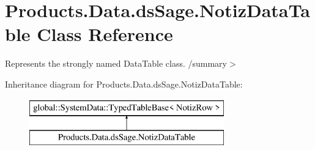 \hypertarget{class_products_1_1_data_1_1ds_sage_1_1_notiz_data_table}{}\section{Products.\+Data.\+ds\+Sage.\+Notiz\+Data\+Table Class Reference}
\label{class_products_1_1_data_1_1ds_sage_1_1_notiz_data_table}


Represents the strongly named Data\+Table class. /summary$>$  


Inheritance diagram for Products.\+Data.\+ds\+Sage.\+Notiz\+Data\+Table\+:\begin{figure}[H]
\begin{center}
\leavevmode
\includegraphics[height=2.000000cm]{class_products_1_1_data_1_1ds_sage_1_1_notiz_data_table}
\end{center}
\end{figure}

